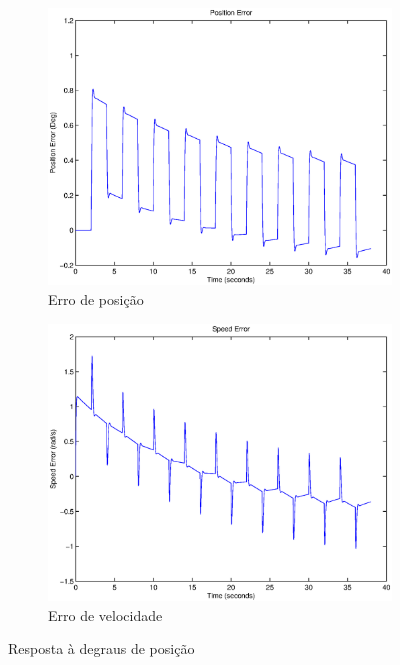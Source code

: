 \documentclass{article}
\begin{document}
\begin{figure}[H]
\begin{subfigure}{0.3\textwidth}
		\includegraphics[width=\linewidth]{matlab/ep6}
		\caption{Erro de posição}
	\end{subfigure}
	\begin{subfigure}{0.3\textwidth}
		\includegraphics[width=\linewidth]{matlab/ew6}
		\caption{Erro de velocidade}
	\end{subfigure}
	\caption{Resposta à degraus de posição}	
	\label{fig:sim6res}
\end{figure}


\end{document}
